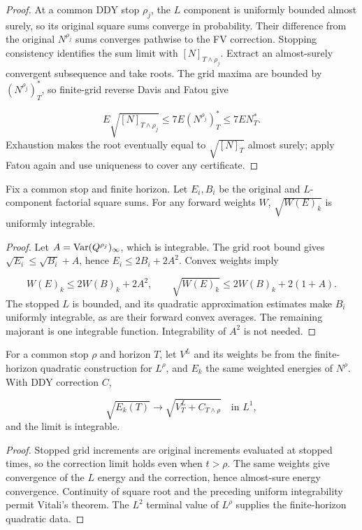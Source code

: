 \begin{proof}
At a common DDY stop $\rho_j$, the $L$ component is uniformly bounded almost
surely, so its original square sums converge in probability. Their difference
from the original $N^{\rho_j}$ sums converges pathwise to the FV correction.
Stopping consistency identifies the sum limit with $[N]_{T\wedge\rho_j}$.
Extract an almost-surely convergent subsequence and take roots. The grid
maxima are bounded by $(N^{\rho_j})_T^*$, so finite-grid reverse Davis and
Fatou give

\[
 E\sqrt{[N]_{T\wedge\rho_j}}\leq7E(N^{\rho_j})_T^*\leq7E N_T^*.
\]
Exhaustion makes the root eventually equal to $\sqrt{[N]_T}$ almost surely;
apply Fatou again and use uniqueness to cover any certificate.
\end{proof}
\begin{lemma}
Fix a common stop and finite horizon. Let $E_i,B_i$ be the original and
$L$-component factorial square sums. For any forward weights $W$,
$\sqrt{W(E)_k}$ is uniformly integrable.
\end{lemma}
\begin{proof}
Let $A=\operatorname{Var}(Q^{\rho_j})_\infty$, which is integrable. The grid root bound gives
$\sqrt{E_i}\leq\sqrt{B_i}+A$, hence $E_i\leq2B_i+2A^2$.
Convex weights imply

\[
 W(E)_k\leq2W(B)_k+2A^2,\qquad
 \sqrt{W(E)_k}\leq2W(B)_k+2(1+A).
\]
The stopped $L$ is bounded, and its quadratic approximation estimates make
$B_i$ uniformly integrable, as are their forward convex averages.
The remaining majorant is one integrable function. Integrability of $A^2$
is not needed.
\end{proof}
\begin{lemma}
For a common stop $\rho$ and horizon $T$, let $V^L$ and its weights be from
the finite-horizon quadratic construction for $L^\rho$, and $E_k$ the same
weighted energies of $N^\rho$. With DDY correction $C$,

\[
 \sqrt{E_k(T)}\longrightarrow\sqrt{V^L_T+C_{T\wedge\rho}}
 \quad\text{in }L^1,
\]
and the limit is integrable.
\end{lemma}
\begin{proof}
Stopped grid increments are original increments evaluated at stopped times,
so the correction limit holds even when $t>\rho$.
The same weights give convergence of the $L$ energy and the correction,
hence almost-sure energy convergence. Continuity of square root and the
preceding uniform integrability permit Vitali's theorem.
The $L^2$ terminal value of $L^\rho$ supplies the finite-horizon quadratic data.
\end{proof}
